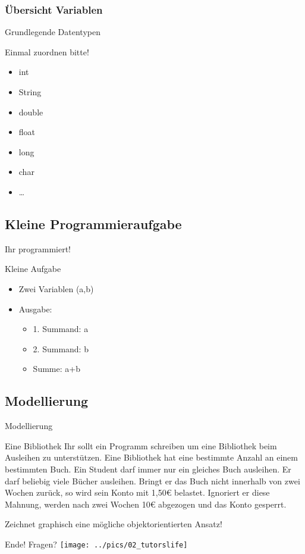 \documentclass{beamer}
\begin{document}
\subsubsection{Übersicht Variablen}
\begin{frame}{Grundlegende Datentypen}
\begin{exampleblock}{Einmal zuordnen bitte!}
\begin{itemize}
\item int
\item String
\item double
\item float
\item long
\item char
\item \dots
\end{itemize}
\end{exampleblock}
\end{frame}

\subsection{Kleine Programmieraufgabe}
\begin{frame}{Ihr programmiert!}
\begin{exampleblock}{Kleine Aufgabe}
\begin{itemize}
\item Zwei Variablen (a,b)
\item Ausgabe:
\begin{itemize}
\item 1. Summand: a
\item 2. Summand: b
\item Summe: a+b
\end{itemize}
\end{itemize}
\end{exampleblock}
\end{frame}

\subsection{Modellierung}
\begin{frame}{Modellierung}
 \begin{exampleblock}{Eine Bibliothek}
 Ihr sollt ein Programm schreiben um eine Bibliothek beim Ausleihen zu unterstützen.
 Eine Bibliothek hat eine bestimmte Anzahl an einem bestimmten Buch. 
 Ein Student darf immer nur ein gleiches Buch ausleihen.
 Er darf beliebig viele Bücher ausleihen.
 Bringt er das Buch nicht innerhalb von zwei Wochen zurück, so wird sein Konto mit 1,50€ belastet.
 Ignoriert er diese Mahnung, werden nach zwei Wochen 10€ abgezogen und das Konto gesperrt.
 \end{exampleblock}
Zeichnet graphisch eine mögliche objektorientierten Ansatz!
 \end{frame}

\begin{frame}{Ende! Fragen?}
 \texttt{[image: ../pics/02\_tutorslife]} 
\end{frame}
\end{document}

